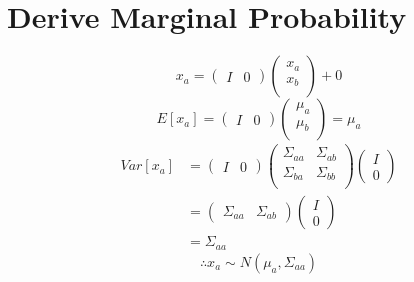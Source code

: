 \documentclass{report}
\begin{document}
\section{Derive Marginal Probability}
$$
x_a = \left (\begin{matrix}I & 0\end{matrix}\right )\left (\begin{matrix}x_a \\x_b\\\end{matrix}\right ) + 0
$$
$$
E[x_a] = \left (\begin{matrix}I & 0\end{matrix}\right )\left (\begin{matrix}\mu_a \\\mu_b \\\end{matrix}\right ) = \mu_a
$$
$$
\begin{aligned}Var[x_a] &= \left (\begin{matrix}I & 0\end{matrix}\right )\left (\begin{matrix}\Sigma_{aa} & \Sigma_{ab} \\\Sigma_{ba} & \Sigma_{bb} \\\end{matrix}\right )\left (\begin{matrix}I \\0\end{matrix}\right ) \\&= \left (\begin{matrix}\Sigma_{aa} & \Sigma_{ab} \end{matrix}\right )\left (\begin{matrix}I \\0\end{matrix}\right )\\&=\Sigma_{aa}\end{aligned}
$$
$$
\therefore x_a \sim N(\mu_a, \Sigma_{aa})
$$
\end{document}
